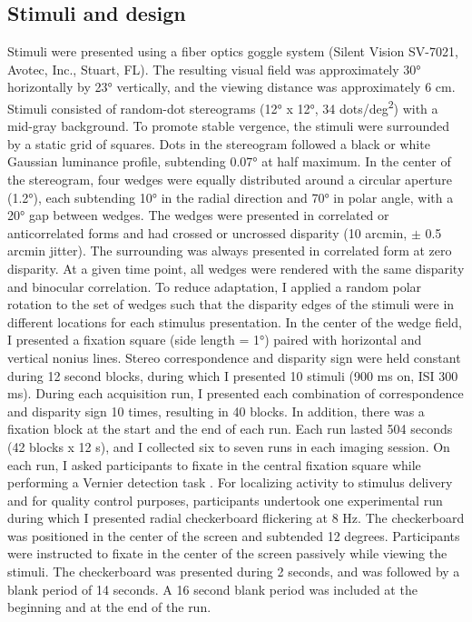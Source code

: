 \subsection{Stimuli and design}
Stimuli were presented using a fiber optics goggle system (Silent Vision SV-7021, Avotec, Inc., Stuart, FL). The resulting visual field was approximately \ang{30} horizontally by \ang{23} vertically, and the viewing distance was approximately 6 cm. Stimuli consisted of random-dot stereograms (\ang{12} x \ang{12}, 34 dots/deg\textsuperscript{2}) with a mid-gray background. To promote stable vergence, the stimuli were surrounded by a static grid of squares. Dots in the stereogram followed a black or white Gaussian luminance profile, subtending \ang{0.07} at half maximum. In the center of the stereogram, four wedges were equally distributed around a circular aperture (\ang{1.2}), each subtending \ang{10} in the radial direction and \ang{70} in polar angle, with a \ang{20} gap between wedges. The wedges were presented in correlated or anticorrelated forms and had crossed or uncrossed disparity (10 arcmin, $\pm$ 0.5 arcmin jitter). The surrounding was always presented in correlated form at zero disparity. At a given time point, all wedges were rendered with the same disparity and binocular correlation. To reduce adaptation, I applied a random polar rotation to the set of wedges such that the disparity edges of the stimuli were in different locations for each stimulus presentation. In the center of the wedge field, I presented a fixation square (side length =  \ang{1}) paired with horizontal and vertical nonius lines.
Stereo correspondence and disparity sign were held constant during 12 second blocks, during which I presented 10 stimuli (900 ms on, ISI 300 ms). During each acquisition run, I presented each combination of correspondence and disparity sign 10 times, resulting in 40 blocks. In addition, there was a fixation block at the start and the end of each run. Each run lasted 504 seconds (42 blocks x 12 s), and I collected six to seven runs in each imaging session. On each run, I asked participants to fixate in the central fixation square while performing a Vernier detection task \cite{Preston:2008dg}.
For localizing activity to stimulus delivery and for quality control purposes, participants undertook one experimental run during which I presented radial checkerboard flickering at 8 Hz. The checkerboard was positioned in the center of the screen and subtended 12 degrees. Participants were instructed to fixate in the center of the screen passively while viewing the stimuli. The checkerboard was presented during 2 seconds, and was followed by a blank period of 14 seconds. A 16 second blank period was included at the beginning and at the end of the run.

